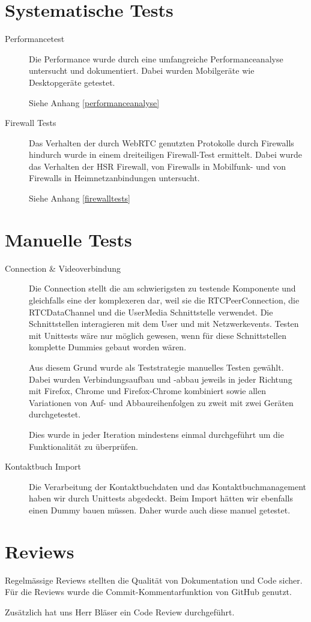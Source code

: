 	\section{Systematische Tests}
		\begin{description}
			\item[Performancetest]
			Die Performance wurde durch eine umfangreiche Performanceanalyse untersucht und dokumentiert. Dabei wurden Mobilgeräte wie Desktopgeräte getestet.
		
			Siehe Anhang \ref{performanceanalyse}
		
			\item[Firewall Tests]
			Das Verhalten der durch WebRTC genutzten Protokolle durch Firewalls hindurch wurde in einem dreiteiligen Firewall-Test ermittelt. Dabei wurde das Verhalten der HSR Firewall, von Firewalls in Mobilfunk- und von Firewalls in Heimnetzanbindungen untersucht. 
		
			Siehe Anhang \ref{firewalltests}
		\end{description}
		
	\section{Manuelle Tests}
		\begin{description}
			\item[Connection \& Videoverbindung]
			Die Connection stellt die am schwierigsten zu testende Komponente und gleichfalls eine der komplexeren dar, weil sie die RTCPeerConnection, die RTCDataChannel und die UserMedia Schnittstelle verwendet. Die Schnittstellen interagieren mit dem User und mit Netzwerkevents. Testen mit Unittests wäre nur möglich gewesen, wenn für diese Schnittstellen komplette Dummies gebaut worden wären. 
		
			Aus diesem Grund wurde als Teststrategie manuelles Testen gewählt. Dabei wurden Verbindungsaufbau und -abbau jeweils in jeder Richtung mit Firefox, Chrome und Firefox-Chrome kombiniert sowie allen Variationen von Auf- und Abbaureihenfolgen zu zweit mit zwei Geräten durchgetestet.
	
			Dies wurde in jeder Iteration mindestens einmal durchgeführt um die Funktionalität zu überprüfen.
		
			\item[Kontaktbuch Import] Die Verarbeitung der Kontaktbuchdaten und das Kontaktbuchmanagement haben wir durch Unittests abgedeckt.
			Beim Import hätten wir ebenfalls einen Dummy bauen müssen. Daher wurde auch diese manuel getestet.
		\end{description}
			
		
	\section{Reviews}
		Regelmässige Reviews stellten die Qualität von Dokumentation und Code sicher. Für die Reviews wurde die Commit-Kommentarfunktion von GitHub genutzt.
		
		Zusätzlich hat uns Herr Bläser ein Code Review durchgeführt.
